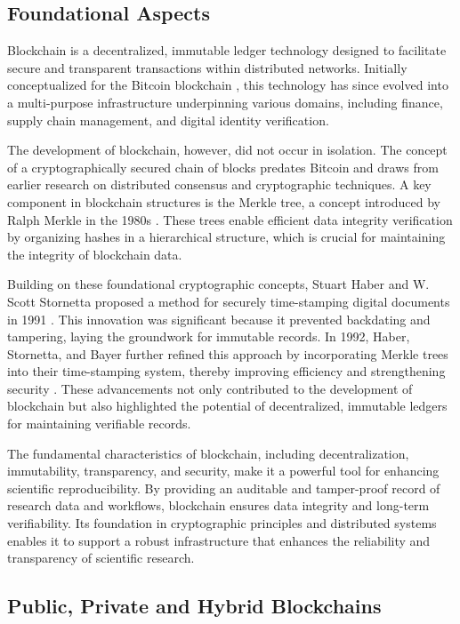 \documentclass{article}
\begin{document}
\subsection{Foundational Aspects}

Blockchain is a decentralized, immutable ledger technology designed to facilitate secure and transparent transactions within distributed networks. Initially conceptualized for the Bitcoin blockchain \cite{nakamoto2008bitcoin}, this technology has since evolved into a multi-purpose infrastructure underpinning various domains, including finance, supply chain management, and digital identity verification.

The development of blockchain, however, did not occur in isolation. The concept of a cryptographically secured chain of blocks predates Bitcoin and draws from earlier research on distributed consensus and cryptographic techniques. A key component in blockchain structures is the Merkle tree, a concept introduced by Ralph Merkle in the 1980s \cite{goos_digital_1988}. These trees enable efficient data integrity verification by organizing hashes in a hierarchical structure, which is crucial for maintaining the integrity of blockchain data.

Building on these foundational cryptographic concepts, Stuart Haber and W. Scott Stornetta proposed a method for securely time-stamping digital documents in 1991 \cite{haber_how_1991}. This innovation was significant because it prevented backdating and tampering, laying the groundwork for immutable records. In 1992, Haber, Stornetta, and Bayer further refined this approach by incorporating Merkle trees into their time-stamping system, thereby improving efficiency and strengthening security \cite{bayer1993improving}. These advancements not only contributed to the development of blockchain but also highlighted the potential of decentralized, immutable ledgers for maintaining verifiable records.

The fundamental characteristics of blockchain, including decentralization, immutability, transparency, and security, make it a powerful tool for enhancing scientific reproducibility. By providing an auditable and tamper-proof record of research data and workflows, blockchain ensures data integrity and long-term verifiability. Its foundation in cryptographic principles and distributed systems enables it to support a robust infrastructure that enhances the reliability and transparency of scientific research.


\subsection{Public, Private and Hybrid Blockchains}
\end{document}
